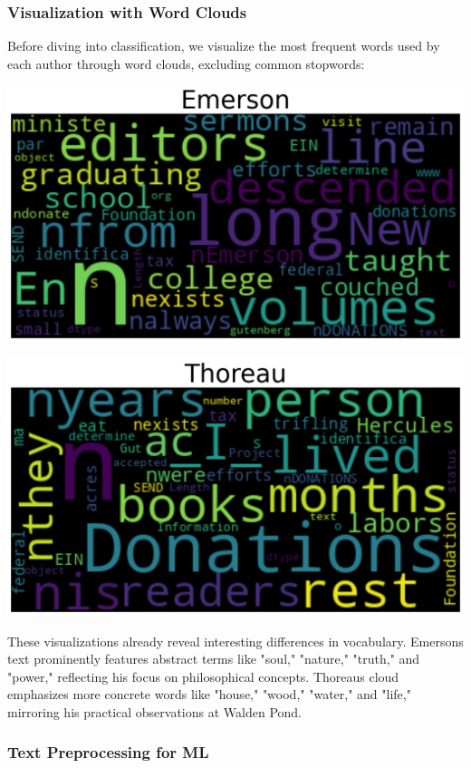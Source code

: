 \documentclass[
]{article}
\begin{document}
\subsubsection{Visualization with Word
Clouds}\label{visualization-with-word-clouds}

Before diving into classification, we visualize the most frequent words
used by each author through word clouds, excluding common stopwords:

\includegraphics{emerson_word_cloud.png}

\includegraphics{thoreau_word_cloud.png}

These visualizations already reveal interesting differences in
vocabulary. Emerson\textquotesingle s text prominently features abstract
terms like "soul," "nature," "truth," and "power," reflecting his focus
on philosophical concepts. Thoreau\textquotesingle s cloud emphasizes
more concrete words like "house," "wood," "water," and "life," mirroring
his practical observations at Walden Pond.

\subsubsection{Text Preprocessing for
ML}\label{text-preprocessing-for-ml}
\end{document}
